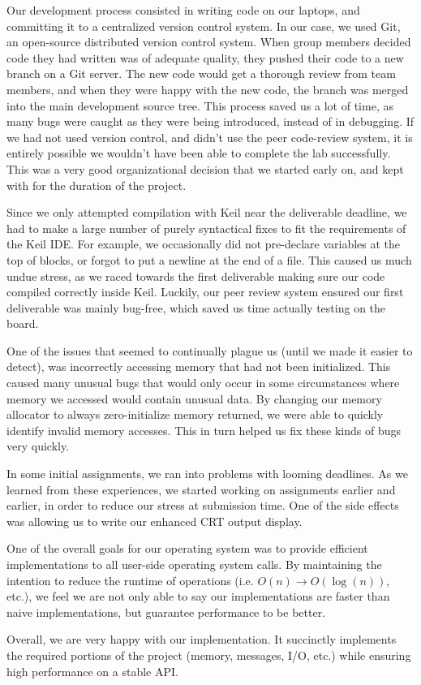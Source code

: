 \documentclass[12pt]{report}
\begin{document}
    Our development process consisted in writing code on our laptops, and
    committing it to a centralized version control system. In our case, we used
    Git, an open-source distributed version control system. When group members
    decided code they had written was of adequate quality, they pushed their
    code to a new branch on a Git server. The new code would get a thorough
    review from team members, and when they were happy with the new code, the
    branch was merged into the main development source tree. This process saved
    us a lot of time, as many bugs were caught as they were being introduced,
    instead of in debugging.
    If we had not used version control, and didn't use the peer code-review
    system, it is entirely possible we wouldn't have been able to complete the
    lab successfully.
    This was a very good organizational decision that we started early on, and
    kept with for the duration of the project.

    Since we only attempted compilation with Keil near the deliverable deadline,
    we had to make a large number of purely syntactical fixes to fit the
    requirements of the Keil IDE. For example, we occasionally did not
    pre-declare variables at the top of blocks, or forgot to put a newline at
    the end of a file.
    This caused us much undue stress, as we raced towards the first deliverable
    making sure our code compiled correctly inside Keil. Luckily, our peer
    review system ensured our first deliverable was mainly bug-free, which saved
    us time actually testing on the board.

    One of the issues that seemed to continually plague us (until we made it
    easier to detect), was incorrectly accessing memory that had not been
    initialized. This caused many unusual bugs that would only occur in some
    circumstances where memory we accessed would contain unusual data. By
    changing our memory allocator to always zero-initialize memory returned, we
    were able to quickly identify invalid memory accesses. This in turn helped
    us fix these kinds of bugs very quickly.

    In some initial assignments, we ran into problems with looming deadlines. As
    we learned from these experiences, we started working on assignments earlier
    and earlier, in order to reduce our stress at submission time. One of the
    side effects was allowing us to write our enhanced CRT output display.

    One of the overall goals for our operating system was to provide efficient
    implementations to all user-side operating system calls. By maintaining the
    intention to reduce the runtime of operations (i.e. $O(n) \to O(\log(n))$,
    etc.), we feel we are not only able to say our implementations are faster
    than naive implementations, but guarantee performance to be better.

    Overall, we are very happy with our implementation. It succinctly implements
    the required portions of the project (memory, messages, I/O, etc.) while
    ensuring high performance on a stable API.
\end{document}
